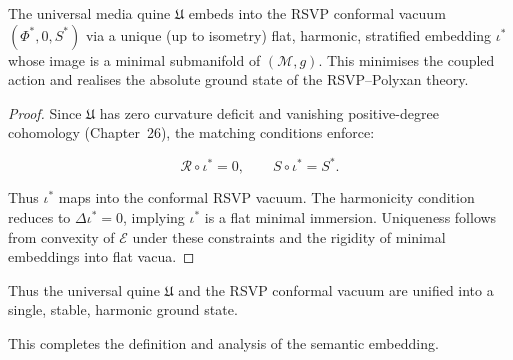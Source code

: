 \begin{theorem}
\label{thm:uinembedding}
The universal media quine $\mathfrak{U}$ embeds into the RSVP conformal
vacuum $(\Phi^\ast,0,S^\ast)$ via a unique (up to isometry) flat,
harmonic, stratified embedding $\iota^\ast$ whose image is a minimal
submanifold of $(\mathcal{M},g)$.  
This minimises the coupled action and realises the absolute ground state
of the RSVP--Polyxan theory.
\end{theorem}

\begin{proof}
Since $\mathfrak{U}$ has zero curvature deficit and vanishing positive-degree
cohomology (Chapter~26), the matching conditions enforce:

\[
\mathcal{R}\circ\iota^\ast = 0,
\qquad
S\circ\iota^\ast = S^\ast.
\]

Thus $\iota^\ast$ maps into the conformal RSVP vacuum.  
The harmonicity condition reduces to $\Delta \iota^\ast = 0$, implying
$\iota^\ast$ is a flat minimal immersion.  
Uniqueness follows from convexity of $\mathcal{E}$ under these
constraints and the rigidity of minimal embeddings into flat vacua.
\end{proof}

\medskip

Thus the universal quine $\mathfrak{U}$ and the RSVP conformal vacuum
are unified into a single, stable, harmonic ground state.

This completes the definition and analysis of the semantic embedding.
